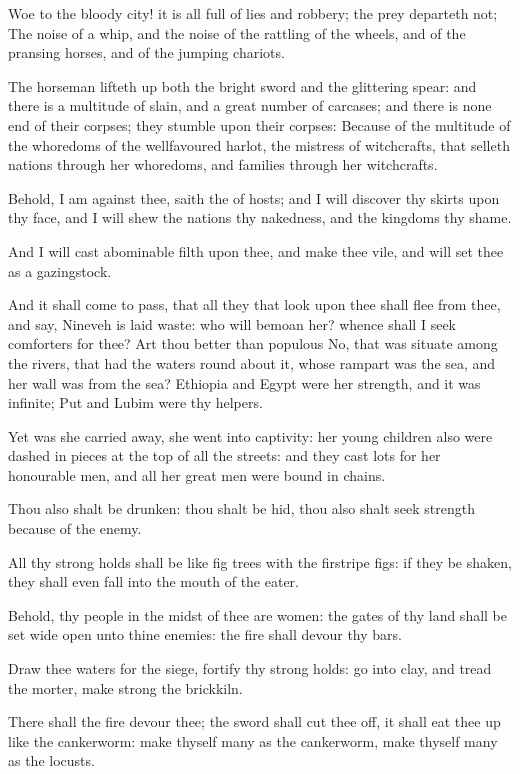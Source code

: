 \Chapter
\Verse Woe to the bloody city! it is all full of lies and robbery; the prey departeth not; \Verse The noise of a whip, and the noise of the rattling of the wheels, and of the pransing horses, and of the jumping chariots.

\Verse The horseman lifteth up both the bright sword and the glittering spear: and there is a multitude of slain, and a great number of carcases; and there is none end of their corpses; they stumble upon their corpses: \Verse Because of the multitude of the whoredoms of the wellfavoured harlot, the mistress of witchcrafts, that selleth nations through her whoredoms, and families through her witchcrafts.

\Verse Behold, I am against thee, saith the \LORD of hosts; and I will discover thy skirts upon thy face, and I will shew the nations thy nakedness, and the kingdoms thy shame.

\Verse And I will cast abominable filth upon thee, and make thee vile, and will set thee as a gazingstock.

\Verse And it shall come to pass, that all they that look upon thee shall flee from thee, and say, Nineveh is laid waste: who will bemoan her?  whence shall I seek comforters for thee?  \Verse Art thou better than populous No, that was situate among the rivers, that had the waters round about it, whose rampart was the sea, and her wall was from the sea?  \Verse Ethiopia and Egypt were her strength, and it was infinite; Put and Lubim were thy helpers.

\Verse Yet was she carried away, she went into captivity: her young children also were dashed in pieces at the top of all the streets: and they cast lots for her honourable men, and all her great men were bound in chains.

\Verse Thou also shalt be drunken: thou shalt be hid, thou also shalt seek strength because of the enemy.

\Verse All thy strong holds shall be like fig trees with the firstripe figs: if they be shaken, they shall even fall into the mouth of the eater.

\Verse Behold, thy people in the midst of thee are women: the gates of thy land shall be set wide open unto thine enemies: the fire shall devour thy bars.

\Verse Draw thee waters for the siege, fortify thy strong holds: go into clay, and tread the morter, make strong the brickkiln.

\Verse There shall the fire devour thee; the sword shall cut thee off, it shall eat thee up like the cankerworm: make thyself many as the cankerworm, make thyself many as the locusts.

